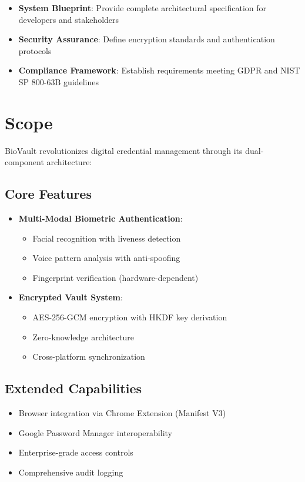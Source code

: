 \documentclass{scrreprt}
\begin{document}
\begin{itemize}
    \item \textbf{System Blueprint}: Provide complete architectural specification for developers and stakeholders
    \item \textbf{Security Assurance}: Define encryption standards and authentication protocols
    \item \textbf{Compliance Framework}: Establish requirements meeting GDPR and NIST SP 800-63B guidelines
\end{itemize}

\section{Scope}
\label{sec:scope}
BioVault revolutionizes digital credential management through its dual-component architecture:

\subsection*{Core Features}
\begin{itemize}
    \item \textbf{Multi-Modal Biometric Authentication}:
    \begin{itemize}
        \item Facial recognition with liveness detection
        \item Voice pattern analysis with anti-spoofing
        \item Fingerprint verification (hardware-dependent)
    \end{itemize}
    
    \item \textbf{Encrypted Vault System}:
    \begin{itemize}
        \item AES-256-GCM encryption with HKDF key derivation
        \item Zero-knowledge architecture
        \item Cross-platform synchronization
    \end{itemize}
\end{itemize}

\subsection*{Extended Capabilities}
\begin{itemize}
    \item Browser integration via Chrome Extension (Manifest V3)
    \item Google Password Manager interoperability
    \item Enterprise-grade access controls
    \item Comprehensive audit logging
\end{itemize}
\end{document}
